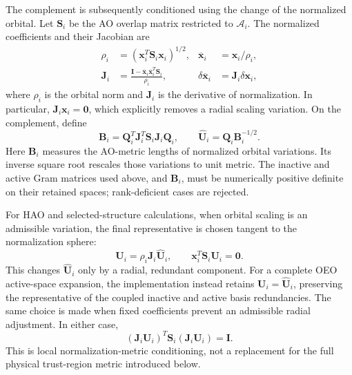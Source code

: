 \documentclass[12pt]{article}
\begin{document}
The complement is subsequently conditioned using the change of the normalized orbital. Let \(\mathbf S_i\) be the AO overlap matrix restricted to \(\mathcal A_i\). The normalized coefficients and their Jacobian are
\begin{equation}
 \begin{aligned}
 \rho_i&=(\mathbf x_i^T\mathbf S_i\mathbf x_i)^{1/2},
 &\overline{\mathbf x}_i&=\mathbf x_i/\rho_i,\\
 \mathbf J_i
 &=\frac{\mathbf I-\overline{\mathbf x}_i
                \overline{\mathbf x}_i^T\mathbf S_i}{\rho_i},
 &\delta\overline{\mathbf x}_i&=\mathbf J_i\delta\mathbf x_i,
 \end{aligned}
 \label{eq:normalization}
\end{equation}
where \(\rho_i\) is the orbital norm and \(\mathbf J_i\) is the derivative of normalization. In particular, \(\mathbf J_i\mathbf x_i=\mathbf 0\), which explicitly removes a radial scaling variation. On the complement, define
\begin{equation}
 \mathbf B_i=\mathbf Q_i^T\mathbf J_i^T\mathbf S_i
                       \mathbf J_i\mathbf Q_i,\qquad
 \widehat{\mathbf U}_i=\mathbf Q_i\mathbf B_i^{-1/2}.
 \label{eq:quotientconditioning}
\end{equation}
Here \(\mathbf B_i\) measures the AO-metric lengths of normalized orbital variations. Its inverse square root rescales those variations to unit metric. The inactive and active Gram matrices used above, and \(\mathbf B_i\), must be numerically positive definite on their retained spaces; rank-deficient cases are rejected.

For HAO and selected-structure calculations, when orbital scaling is an admissible variation, the final representative is chosen tangent to the normalization sphere:
\begin{equation}
 \mathbf U_i=\rho_i\mathbf J_i\widehat{\mathbf U}_i,
 \qquad
 \mathbf x_i^T\mathbf S_i\mathbf U_i=\mathbf 0.
 \label{eq:sphererepresentative}
\end{equation}
This changes \(\widehat{\mathbf U}_i\) only by a radial, redundant component. For a complete OEO active-space expansion, the implementation instead retains
\(\mathbf U_i=\widehat{\mathbf U}_i\), preserving the representative of the coupled inactive and active basis redundancies. The same choice is made when fixed coefficients prevent an admissible radial adjustment. In either case,
\begin{equation}
 (\mathbf J_i\mathbf U_i)^T\mathbf S_i
       (\mathbf J_i\mathbf U_i)=\mathbf I.
 \label{eq:normalizedtangentmetric}
\end{equation}
This is local normalization-metric conditioning, not a replacement for the full physical trust-region metric introduced below.
\end{document}
